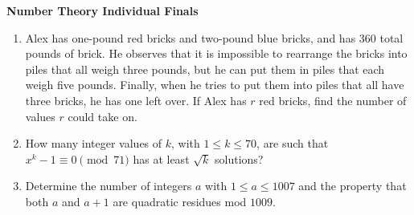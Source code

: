 \documentclass[10pt]{article}
\begin{document}
\newpage

\begin{center}
\huge\textbf{Number Theory Individual Finals}
\end{center} \vspace{3pt}

\begin{enumerate}
\item Alex has one-pound red bricks and two-pound blue bricks, and has 360 total pounds of brick. He observes that it is impossible to rearrange the bricks into piles that all weigh three pounds, but he can put them in piles that each weigh five pounds. Finally, when he tries to put them into piles that all have three bricks, he has one left over. If Alex has $r$ red bricks, find the number of values $r$ could take on. 

\item How many integer values of $k$, with $1 \leq k \leq 70$, are such that $x^{k}-1 \equiv 0 \pmod{71}$ has at least $\sqrt{k}$ solutions?

\item Determine the number of integers $a$ with $1\leq a\leq 1007$ and the property that both $a$ and $a+1$ are quadratic residues mod $1009$.
\end{enumerate}
\end{document}
